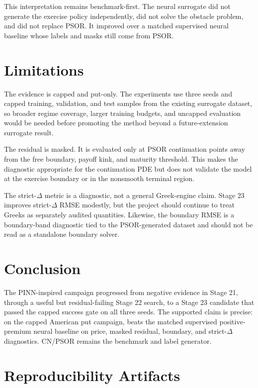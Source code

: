 \documentclass[11pt]{article}
\begin{document}
This interpretation remains benchmark-first. The neural surrogate did not generate the exercise policy independently, did not solve the obstacle problem, and did not replace PSOR. It improved over a matched supervised neural baseline whose labels and masks still come from PSOR.

\section{Limitations}

The evidence is capped and put-only. The experiments use three seeds and capped training, validation, and test samples from the existing surrogate dataset, so broader regime coverage, larger training budgets, and uncapped evaluation would be needed before promoting the method beyond a future-extension surrogate result.

The residual is masked. It is evaluated only at PSOR continuation points away from the free boundary, payoff kink, and maturity threshold. This makes the diagnostic appropriate for the continuation PDE but does not validate the model at the exercise boundary or in the nonsmooth terminal region.

The strict-\(\Delta\) metric is a diagnostic, not a general Greek-engine claim. Stage 23 improves strict-\(\Delta\) RMSE modestly, but the project should continue to treat Greeks as separately audited quantities. Likewise, the boundary RMSE is a boundary-band diagnostic tied to the PSOR-generated dataset and should not be read as a standalone boundary solver.

\section{Conclusion}

The PINN-inspired campaign progressed from negative evidence in Stage 21, through a useful but residual-failing Stage 22 search, to a Stage 23 candidate that passed the capped success gate on all three seeds. The supported claim is precise: on the capped American put campaign,  beats the matched supervised positive-premium neural baseline on price, masked residual, boundary, and strict-\(\Delta\) diagnostics. CN/PSOR remains the benchmark and label generator.

\FloatBarrier

\section*{Reproducibility Artifacts}
\end{document}
